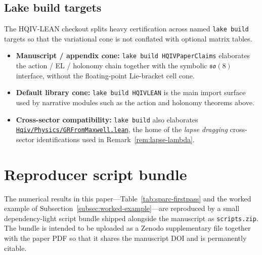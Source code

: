 \documentclass[11pt]{amsart}
\newcommand{\leanrepo}{https://github.com/HQIV/hqiv-lean/blob/main}
\newcommand{\leanfile}[1]{\href{\leanrepo/#1}{\nolinkurl{#1}}}
\begin{document}
\subsection{Lake build targets}
\label{subsec:lake-targets}

The HQIV-LEAN checkout splits heavy certification across named \texttt{lake build} targets so that the variational cone is not conflated with optional matrix tables.
\begingroup
\sloppy
\setlength{\emergencystretch}{4em}
\begin{itemize}
  \item \textbf{Manuscript / appendix cone:} \texttt{lake build HQIVPaperClaims} elaborates the action / EL / holonomy chain together with the symbolic \(\mathfrak{so}(8)\) interface, without the floating-point Lie-bracket cell cone.
  \item \textbf{Default library cone:} \texttt{lake build HQIVLEAN} is the main import surface used by narrative modules such as the action and holonomy theorems above.
  \item \textbf{Cross-sector compatibility:} \texttt{lake build} also elaborates \leanfile{Hqiv/Physics/GRFromMaxwell.lean}, the home of the \emph{lapse dragging} cross-sector identifications used in Remark~\ref{rem:lapse-lambda}.
\end{itemize}
\endgroup

\section{Reproducer script bundle}
\label{app:scripts}

The numerical results in this paper---Table~\ref{tab:sparc-firstpass} and the worked example of Subsection~\ref{subsec:worked-example}---are reproduced by a small dependency-light script bundle shipped alongside the manuscript as \texttt{scripts.zip}. The bundle is intended to be uploaded as a Zenodo supplementary file together with the paper PDF so that it shares the manuscript DOI and is permanently citable.
\end{document}
